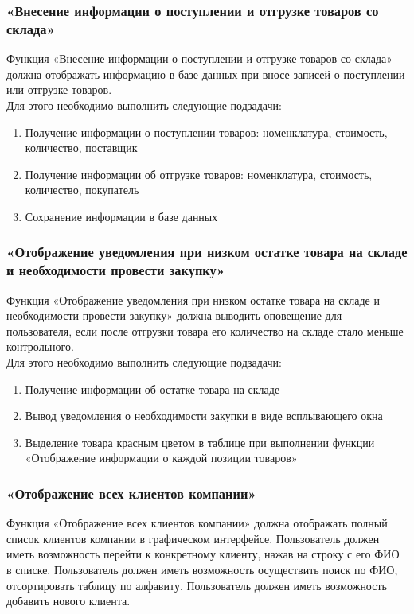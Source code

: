 \documentclass[a4paper,12pt]{article}
\begin{document}
\subsubsection{«Внесение информации о поступлении и отгрузке товаров со склада»}
Функция «Внесение информации о поступлении и отгрузке товаров со склада» должна отображать информацию в базе данных при вносе записей о поступлении или отгрузке товаров.\\

Для этого необходимо выполнить следующие подзадачи:
\begin{enumerate}
    \item Получение информации о поступлении товаров: номенклатура, стоимость, количество, поставщик
    \item Получение информации об отгрузке товаров: номенклатура, стоимость, количество, покупатель
    \item Сохранение информации в базе данных
\end{enumerate}

\subsubsection{«Отображение уведомления при низком остатке товара на складе и необходимости провести закупку»}
Функция «Отображение уведомления при низком остатке товара на складе и необходимости провести закупку» должна выводить оповещение для пользователя, если после отгрузки товара его количество на складе стало меньше контрольного.\\

Для этого необходимо выполнить следующие подзадачи:
\begin{enumerate}
    \item Получение информации об остатке товара на складе
    \item Вывод уведомления о необходимости закупки в виде всплывающего окна
    \item Выделение товара красным цветом в таблице при выполнении функции «Отображение информации о каждой позиции товаров»
\end{enumerate}

\subsubsection{«Отображение всех клиентов компании»}
Функция «Отображение всех клиентов компании» должна отображать полный список клиентов компании в графическом интерфейсе. Пользователь должен иметь возможность перейти к конкретному клиенту, нажав на строку с его ФИО в списке. Пользователь должен иметь возможность осуществить поиск по ФИО, отсортировать таблицу по алфавиту. Пользователь должен иметь возможность добавить нового клиента.\\
\end{document}
